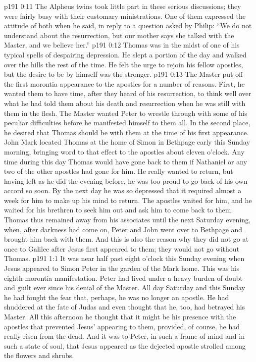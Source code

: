 \vs p191 0:11 The Alpheus twins took little part in these serious discussions; they were fairly busy with their customary ministrations. One of them expressed the attitude of both when he said, in reply to a question asked by Philip: “We do not understand about the resurrection, but our mother says she talked with the Master, and we believe her.”
\vs p191 0:12 Thomas was in the midst of one of his typical spells of despairing depression. He slept a portion of the day and walked over the hills the rest of the time. He felt the urge to rejoin his fellow apostles, but the desire to be by himself was the stronger.
\vs p191 0:13 The Master put off the first morontia appearance to the apostles for a number of reasons. First, he wanted them to have time, after they heard of his resurrection, to think well over what he had told them about his death and resurrection when he was still with them in the flesh. The Master wanted Peter to wrestle through with some of his peculiar difficulties before he manifested himself to them all. In the second place, he desired that Thomas should be with them at the time of his first appearance. John Mark located Thomas at the home of Simon in Bethpage early this Sunday morning, bringing word to that effect to the apostles about eleven o’clock. Any time during this day Thomas would have gone back to them if Nathaniel or any two of the other apostles had gone for him. He really wanted to return, but having left as he did the evening before, he was too proud to go back of his own accord so soon. By the next day he was so depressed that it required almost a week for him to make up his mind to return. The apostles waited for him, and he waited for his brethren to seek him out and ask him to come back to them. Thomas thus remained away from his associates until the next Saturday evening, when, after darkness had come on, Peter and John went over to Bethpage and brought him back with them. And this is also the reason why they did not go at once to Galilee after Jesus first appeared to them; they would not go without Thomas.\plusone
{}
\vs p191 1:1 It was near half past eight o’clock this Sunday evening when Jesus appeared to Simon Peter in the garden of the Mark home. This was his eighth morontia manifestation. Peter had lived under a heavy burden of doubt and guilt ever since his denial of the Master. All day Saturday and this Sunday he had fought the fear that, perhaps, he was no longer an apostle. He had shuddered at the fate of Judas and even thought that he, too, had betrayed his Master. All this afternoon he thought that it might be his presence with the apostles that prevented Jesus’ appearing to them, provided, of course, he had really risen from the dead. And it was to Peter, in such a frame of mind and in such a state of soul, that Jesus appeared as the dejected apostle strolled among the flowers and shrubs.
